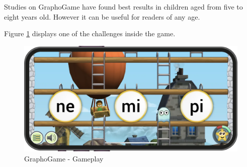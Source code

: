 Studies on GraphoGame have found best results in children aged from five to eight years old. However it can be useful for readers of any age.

Figure \ref{fig:graphogame} displays one of the challenges inside the game.

\begin{figure}[H]
    \centering
    \includegraphics[width=0.8\linewidth]{Chapters/related_work_img/graphogamegameplay.png}
    \caption{GraphoGame - Gameplay}
    \label{fig:graphogame}
\end{figure}